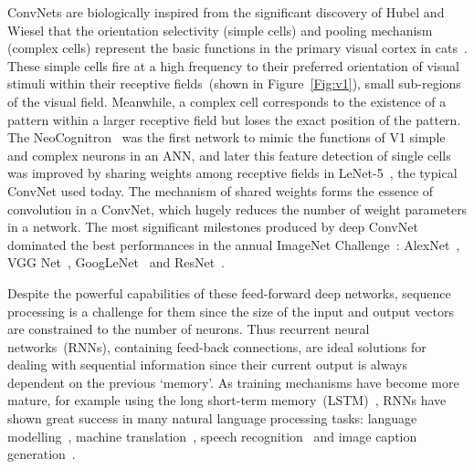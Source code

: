 ConvNets are biologically inspired from the significant discovery of Hubel and Wiesel that the orientation selectivity (simple cells) and pooling mechanism (complex cells) represent the basic functions in the primary visual cortex in cats~\citep{hubel1962receptive}.
These simple cells fire at a high frequency to their preferred orientation of visual stimuli within their receptive fields~(shown in Figure~\ref{Fig:v1}), small sub-regions of the visual field.
Meanwhile, a complex cell corresponds to the existence of a pattern within a larger receptive field but loses the exact position of the pattern.
The NeoCognitron~\citep{fukushima1982neocognitron} was the first network to mimic the functions of V1 simple and complex neurons in an ANN, and later this feature detection of single cells was improved by sharing weights among receptive fields in LeNet-5~\citep{lecun1998gradient}, the typical ConvNet used today.
The mechanism of shared weights forms the essence of convolution in a ConvNet, which hugely reduces the number of weight parameters in a network.
The most significant milestones produced by deep ConvNet dominated the best performances in the annual ImageNet Challenge~\citep{russakovsky2015imagenet}: AlexNet~\citep{krizhevsky2012imagenet}, VGG Net~\citep{simonyan2014very}, GoogLeNet~\citep{szegedy2015going} and ResNet~\citep{he2016deep}.

Despite the powerful capabilities of these feed-forward deep networks, sequence processing is a challenge for them since the size of the input and output vectors are constrained to the number of neurons.
Thus recurrent neural networks~(RNNs), containing feed-back connections, are ideal solutions for dealing with sequential information since their current output is always dependent on the previous `memory'.
As training mechanisms have become more mature, for example using the long short-term memory~(LSTM)~\citep{hochreiter1997long}, RNNs have shown great success in many natural language processing tasks: language modelling~\citep{mikolov2010recurrent}, machine translation~\citep{sutskever2014sequence}, speech recognition~\citep{graves2014towards} and image caption generation~\citep{karpathy2015deep}.

